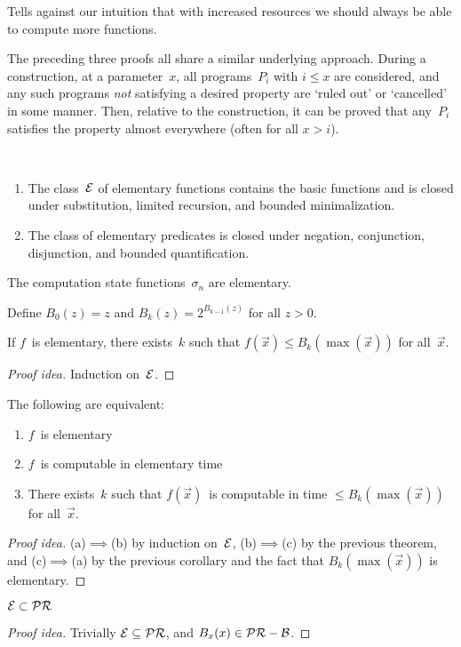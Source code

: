 \begin{app}
Tells against our intuition that with increased resources we should always be able to compute more functions.
\end{app}

\begin{rmk}
The preceding three proofs all share a similar underlying approach. During a construction, at a parameter~\(x\), all programs~\(P_i\) with \(i\le x\) are considered, and any such programs \emph{not} satisfying a desired property are `ruled out' or `cancelled' in some manner. Then, relative to the construction, it can be proved that any~\(P_i\) satisfies the property almost everywhere (often for all \(x>i\)).
\end{rmk}

\begin{thm}
\ 
\begin{enumerate}[itemsep=0pt]
\item[(a)] The class~\(\mathcal{E}\) of elementary functions contains the basic functions and is closed under substitution, limited recursion, and bounded minimalization.
\item[(c)] The class of elementary predicates is closed under negation, conjunction, disjunction, and bounded quantification.
\end{enumerate}
\end{thm}

\begin{cor}
The computation state functions~\(\sigma_n\) are elementary.
\end{cor}

\noindent Define \(B_0(z)=z\) and \(B_k(z)=2^{B_{k-1}(z)}\) for all \(z>0\).

\begin{thm}
If \(f\)~is elementary, there exists~\(k\) such that \(f(\vec{x})\le B_k(\max(\vec{x}))\) for all~\(\vec{x}\).
\end{thm}
\begin{proof}[Proof idea]
Induction on~\(\mathcal{E}\).
\end{proof}

\begin{thm}
The following are equivalent:
\begin{enumerate}[itemsep=0pt]
\item[(a)] \(f\)~is elementary
\item[(b)] \(f\)~is computable in elementary time
\item[(c)] There exists~\(k\) such that \(f(\vec{x})\)~is computable in time \(\le B_k(\max(\vec{x}))\) for all~\(\vec{x}\).
\end{enumerate}
\end{thm}
\begin{proof}[Proof idea]
(a)\(\implies\)(b) by induction on~\(\mathcal{E}\), (b)\(\implies\)(c) by the previous theorem, and (c)\(\implies\)(a) by the previous corollary and the fact that \(B_k(\max(\vec{x}))\) is elementary.
\end{proof}

\begin{cor}
\(\mathcal{E}\subset\mathcal{PR}\)
\end{cor}
\begin{proof}[Proof idea]
Trivially \(\mathcal{E}\subseteq\mathcal{PR}\), and \(B_x(x)\in\mathcal{PR}-\mathcal{B}\).
\end{proof}
